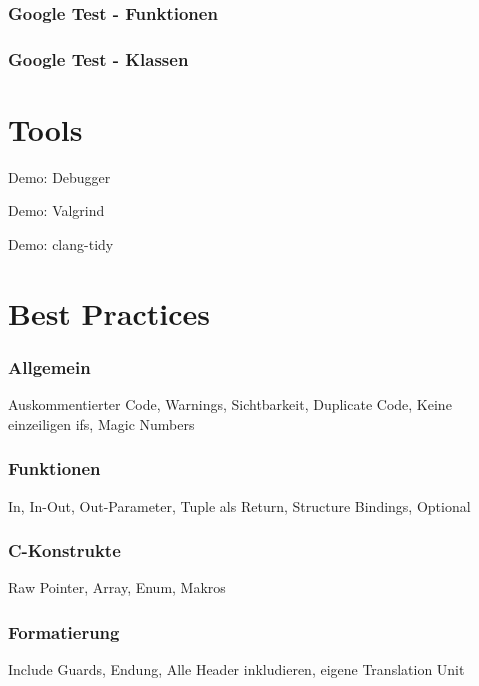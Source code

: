 \documentclass[aspectratio=169]{beamer}
\begin{document}
\begin{frame}
    \frametitle{Google Test - Funktionen}
    
\end{frame}

\begin{frame}
    \frametitle{Google Test - Klassen}
    
\end{frame}

\section{Tools}
\begin{frame}
    \Huge{Demo: Debugger}
\end{frame}

\begin{frame}
    \Huge{Demo: Valgrind}
\end{frame}

\begin{frame}
    \Huge{Demo: clang-tidy}
\end{frame}

\section{Best Practices}
\begin{frame}
    \frametitle{Allgemein}
    Auskommentierter Code, Warnings, Sichtbarkeit, Duplicate Code,
    Keine einzeiligen ifs, Magic Numbers
\end{frame}

\begin{frame}
    \frametitle{Funktionen}
    In, In-Out, Out-Parameter, Tuple als Return, Structure Bindings, Optional
\end{frame}

\begin{frame}
    \frametitle{C-Konstrukte}
    Raw Pointer, Array, Enum, Makros
\end{frame}

\begin{frame}
    \frametitle{Formatierung}
    Include Guards, Endung, Alle Header inkludieren, eigene Translation Unit
\end{frame}
\end{document}
